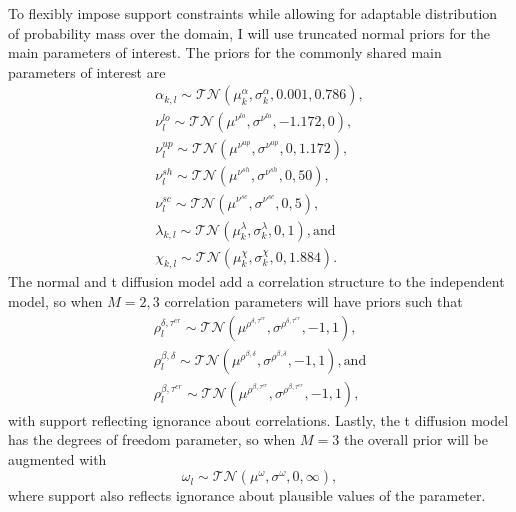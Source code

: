 \documentclass[12pt]{report}
\begin{document}
To flexibly impose support constraints while allowing for adaptable distribution of probability mass over the domain, I will use truncated normal priors for the main parameters of interest. The priors for the commonly shared main parameters of interest are
\begin{eqnarray}
\alpha_{k,l} \sim \mathcal{TN}(\mu_k^{\alpha},\sigma_k^{\alpha},0.001, 0.786), \nonumber \\
\nu_{l}^{lo} \sim \mathcal{TN}(\mu^{\nu^{lo}},\sigma^{\nu^{lo}},-1.172, 0), \nonumber \\
\nu_{l}^{up} \sim \mathcal{TN}(\mu^{\nu^{up}},\sigma^{\nu^{up}},0, 1.172), \nonumber \\
\nu_{l}^{sh} \sim \mathcal{TN}(\mu^{\nu^{sh}},\sigma^{\nu^{sh}},0, 50), \\
\nu_{l}^{sc} \sim \mathcal{TN}(\mu^{\nu^{sc}},\sigma^{\nu^{sc}},0, 5), \nonumber \\
\lambda_{k,l} \sim \mathcal{TN}(\mu_k^{\lambda},\sigma_k^{\lambda}, 0, 1), \text{and} \nonumber \\
\chi_{k,l} \sim \mathcal{TN}(\mu_k^{\chi},\sigma_k^{\chi},0, 1.884) \nonumber.
\end{eqnarray}
The normal and t diffusion model add a correlation structure to the independent model, so when $M = 2, 3$ correlation parameters will have priors such that
\begin{eqnarray}
\rho_l^{\delta,\tau^{er}} \sim \mathcal{TN}(\mu^{\rho^{\delta,\tau^{er}}}, \sigma^{\rho^{\delta,\tau^{er}}}, -1, 1), \nonumber \\
\rho_l^{\beta,\delta} \sim \mathcal{TN}(\mu^{\rho^{\beta,\delta}}, \sigma^{\rho^{\beta,\delta}}, -1 , 1), \text{and} \\
\rho_l^{\beta,\tau^{er}} \sim \mathcal{TN}(\mu^{\rho^{\beta,\tau^{er}}}, \sigma^{\rho^{\beta,\tau^{er}}}, -1, 1), \nonumber
\end{eqnarray}
with support reflecting ignorance about correlations.
Lastly, the t diffusion model has the degrees of freedom parameter, so when $M = 3$ the overall prior will be augmented with 
\begin{equation}
\omega_l \sim \mathcal{TN}(\mu^{\omega}, \sigma^{\omega},0, \infty),
\end{equation}
where support also reflects ignorance about plausible values of the parameter.
\end{document}
